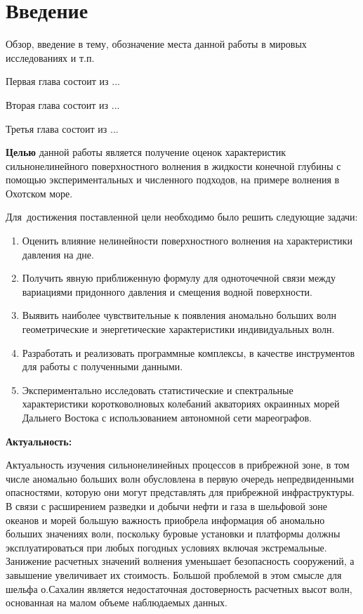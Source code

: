 \chapter*{Введение}							%
Обзор, введение в тему, обозначение места данной работы в мировых исследованиях и т.п.

Первая глава состоит из ...

Вторая глава состоит из ...

Третья глава состоит из ...

\textbf{Целью} данной работы является получение оценок характеристик сильнонелинейного поверхностного волнения в жидкости конечной глубины с помощью экспериментальных и численного подходов, на примере волнения в Охотском море.

Для~достижения поставленной цели необходимо было решить следующие задачи:
\begin{enumerate}
  \item Оценить влияние нелинейности поверхностного волнения на характеристики давления на дне.

  \item Получить явную приближенную формулу для одноточечной связи между вариациями придонного давления и  смещения водной поверхности.

  \item Выявить наиболее чувствительные к появления аномально больших волн геометрические и энергетические характеристики индивидуальных волн.

  \item Разработать и реализовать программные комплексы, в качестве инструментов для работы с полученными данными.


  \item Экспериментально исследовать статистические и спектральные характеристики коротковолновых колебаний акваториях окраинных морей Дальнего Востока с использованием автономной сети мареографов.

\end{enumerate}

\textbf{Актуальность:}

Актуальность изучения сильнонелинейных процессов в прибрежной зоне, в том числе аномально больших волн обусловлена в первую очередь непредвиденными опасностями, которую они могут представлять для прибрежной инфраструктуры. В связи с расширением разведки и добычи нефти и газа в шельфовой зоне океанов и морей большую важность приобрела информация об аномально больших значениях волн, поскольку буровые установки и платформы должны эксплуатироваться при любых погодных условиях включая экстремальные. Занижение расчетных значений волнения уменьшает безопасность сооружений, а завышение увеличивает их стоимость. Большой проблемой в этом смысле для шельфа о.Сахалин является недостаточная достоверность расчетных высот волн, основанная на малом объеме наблюдаемых данных.

